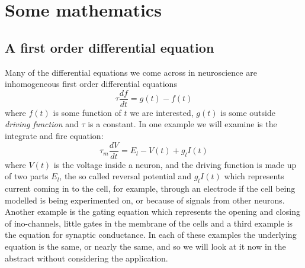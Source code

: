 \documentclass{article}
\begin{document}
\section*{Some mathematics}
\subsection*{A first order differential equation}
Many of the differential equations we come across in neuroscience are
inhomogeneous first order differential equations
\begin{equation}
\tau\frac{df}{dt}=g(t)-f(t)
\end{equation}
where $f(t)$ is some function of $t$ we are interested, $g(t)$ is some
outside \textsl{driving function} and $\tau$ is a constant. In one
example we will examine is the integrate and fire equation:
\begin{equation}
\tau_m\frac{dV}{dt}=E_l-V(t)+g_lI(t)
\end{equation}
where $V(t)$ is the voltage inside a neuron, and the driving function
is made up of two parts $E_l$, the so called reversal potential and
$g_lI(t)$ which represents current coming in to the cell, for example,
through an electrode if the cell being modelled is being experimented
on, or because of signals from other neurons. Another example is the
gating equation which represents the opening and closing of
ino-channels, little gates in the membrane of the cells and a third
example is the equation for synaptic conductance. In each of these
examples the underlying equation is the same, or nearly the same, and
so we will look at it now in the abstract without considering the
application.
\end{document}
